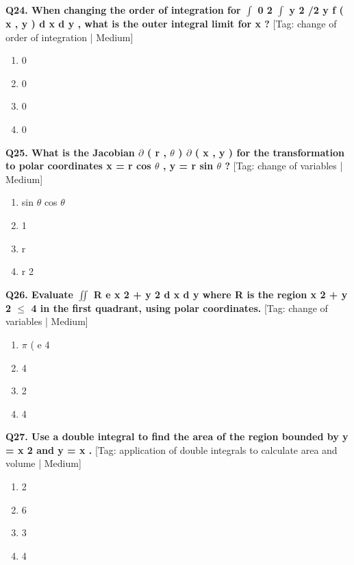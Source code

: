 \noindent\textbf{Q24. When changing the order of integration for $\int$ 0 2 $\int$ y 2 /2 y f ( x , y ) d x d y , what is the outer integral limit for x ?} \hfill [Tag: change of order of integration | Medium]
\begin{enumerate}[label=(\alph*),topsep=2pt,itemsep=1pt,partopsep=0pt,parsep=0pt]
    \item {{0}}
    \item {{0}}
    \item {{0}}
    \item {{0}}
\end{enumerate}
\vspace{2mm}

\noindent\textbf{Q25. What is the Jacobian $\partial$ ( r , $\theta$ ) $\partial$ ( x , y ) for the transformation to polar coordinates x = r cos $\theta$ , y = r sin $\theta$ ?} \hfill [Tag: change of variables | Medium]
\begin{enumerate}[label=(\alph*),topsep=2pt,itemsep=1pt,partopsep=0pt,parsep=0pt]
    \item {{sin $\theta$ cos $\theta$}}
    \item {{1}}
    \item {{r}}
    \item {{r 2}}
\end{enumerate}
\vspace{2mm}

\noindent\textbf{Q26. Evaluate $\iint$ R e x 2 + y 2 d x d y where R is the region x 2 + y 2 $\le$ 4 in the first quadrant, using polar coordinates.} \hfill [Tag: change of variables | Medium]
\begin{enumerate}[label=(\alph*),topsep=2pt,itemsep=1pt,partopsep=0pt,parsep=0pt]
    \item {{$\pi$ ( e 4}}
    \item {{4}}
    \item {{2}}
    \item {{4}}
\end{enumerate}
\vspace{2mm}

\noindent\textbf{Q27. Use a double integral to find the area of the region bounded by y = x 2 and y = x .} \hfill [Tag: application of double integrals to calculate area and volume | Medium]
\begin{enumerate}[label=(\alph*),topsep=2pt,itemsep=1pt,partopsep=0pt,parsep=0pt]
    \item {{2}}
    \item {{6}}
    \item {{3}}
    \item {{4}}
\end{enumerate}
\vspace{2mm}

